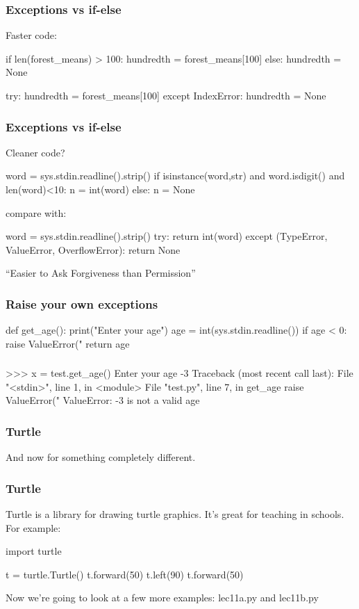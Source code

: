 \documentclass{beamer}
\begin{document}
\begin{frame}[fragile]
\frametitle{Exceptions vs if-else}
Faster code:
\begin{code}
if len(forest_means) > 100:
   hundredth = forest_means[100]
else:
   hundredth = None
\end{code}

\bigskip

\begin{code}
try:
   hundredth = forest_means[100]
except IndexError:
   hundredth = None
\end{code}
\end{frame}


\begin{frame}[fragile]
\frametitle{Exceptions vs if-else}
Cleaner code?
\begin{code}
word = sys.stdin.readline().strip()
if isinstance(word,str)  and word.isdigit() and len(word)<10:
   n = int(word)
else:
   n = None
\end{code}

\bigskip

compare with:

\begin{code}
word = sys.stdin.readline().strip()
try:
    return int(word)
except (TypeError, ValueError, OverflowError): 
    return None
\end{code}
``Easier to Ask Forgiveness than Permission'' 
\end{frame}

\begin{frame}[fragile]
\frametitle{Raise your own exceptions}
\begin{code}
def get_age():
   print("Enter your age") 
   age = int(sys.stdin.readline())
   if age < 0:
      raise ValueError("%
   return age
\end{code}
\end{frame}


\begin{frame}[fragile]
\frametitle{}
\begin{code}
>>> x = test.get_age()
Enter your age
-3
Traceback (most recent call last):
  File "<stdin>", line 1, in <module>
  File "test.py", line 7, in get_age
    raise ValueError("%
ValueError: -3 is not a valid age
\end{code}
\end{frame}


\begin{frame}[fragile]
\frametitle{Turtle}
And now for something completely different.
\end{frame}


\begin{frame}[fragile]
\frametitle{Turtle}
Turtle is a library for drawing turtle graphics. It's great for
teaching in schools. For example:

\begin{code}
import turtle

t = turtle.Turtle()
t.forward(50)
t.left(90)
t.forward(50)
\end{code}

\bigskip

Now we're going to look at a few more examples: lec11a.py and
lec11b.py
\end{frame}
\end{document}
